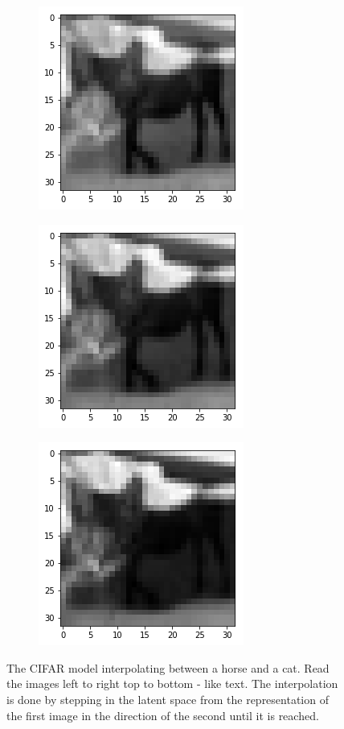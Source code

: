 \begin{figure}[H]
\begin{subfigure}{.3\linewidth}
\end{subfigure}
\begin{subfigure}{.3\linewidth}
    \centering
    \includegraphics[scale=0.4]{chapter_3_figures/interp8.png}
\end{subfigure}
    \hfill
\begin{subfigure}{.3\linewidth}
    \centering
    \includegraphics[scale=0.4]{chapter_3_figures/interp9.png}
\end{subfigure}
   \hfill
\begin{subfigure}{.3\linewidth}
    \centering
    \includegraphics[scale=0.4]{chapter_3_figures/interp10.png}
\end{subfigure}
\caption{The CIFAR model interpolating between a horse and a cat. Read the images left to right top to bottom - like text. The interpolation is done by stepping in the latent space from the representation of the first image in the direction of the second until it is reached.}
\end{figure}

